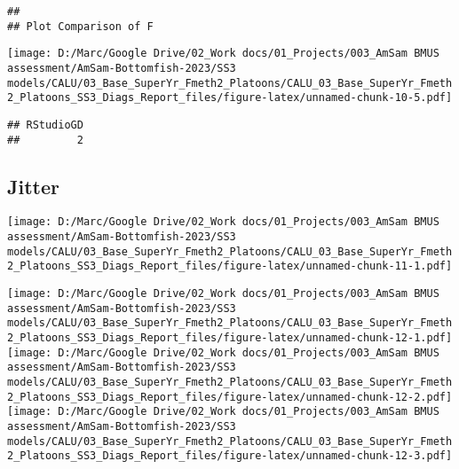 \documentclass[
]{article}
\begin{document}
\begin{verbatim}
## 
## Plot Comparison of F
\end{verbatim}

\texttt{[image: D:/Marc/Google Drive/02\_Work docs/01\_Projects/003\_AmSam BMUS assessment/AmSam-Bottomfish-2023/SS3 models/CALU/03\_Base\_SuperYr\_Fmeth2\_Platoons/CALU\_03\_Base\_SuperYr\_Fmeth2\_Platoons\_SS3\_Diags\_Report\_files/figure-latex/unnamed-chunk-10-5.pdf]}

\begin{verbatim}
## RStudioGD 
##         2
\end{verbatim}

\hypertarget{jitter}{%
\subsection{Jitter}\label{jitter}}

\texttt{[image: D:/Marc/Google Drive/02\_Work docs/01\_Projects/003\_AmSam BMUS assessment/AmSam-Bottomfish-2023/SS3 models/CALU/03\_Base\_SuperYr\_Fmeth2\_Platoons/CALU\_03\_Base\_SuperYr\_Fmeth2\_Platoons\_SS3\_Diags\_Report\_files/figure-latex/unnamed-chunk-11-1.pdf]}

\texttt{[image: D:/Marc/Google Drive/02\_Work docs/01\_Projects/003\_AmSam BMUS assessment/AmSam-Bottomfish-2023/SS3 models/CALU/03\_Base\_SuperYr\_Fmeth2\_Platoons/CALU\_03\_Base\_SuperYr\_Fmeth2\_Platoons\_SS3\_Diags\_Report\_files/figure-latex/unnamed-chunk-12-1.pdf]}
\texttt{[image: D:/Marc/Google Drive/02\_Work docs/01\_Projects/003\_AmSam BMUS assessment/AmSam-Bottomfish-2023/SS3 models/CALU/03\_Base\_SuperYr\_Fmeth2\_Platoons/CALU\_03\_Base\_SuperYr\_Fmeth2\_Platoons\_SS3\_Diags\_Report\_files/figure-latex/unnamed-chunk-12-2.pdf]}
\texttt{[image: D:/Marc/Google Drive/02\_Work docs/01\_Projects/003\_AmSam BMUS assessment/AmSam-Bottomfish-2023/SS3 models/CALU/03\_Base\_SuperYr\_Fmeth2\_Platoons/CALU\_03\_Base\_SuperYr\_Fmeth2\_Platoons\_SS3\_Diags\_Report\_files/figure-latex/unnamed-chunk-12-3.pdf]}

\hypertarget{section}{%
\subsection{}\label{section}}
\end{document}
